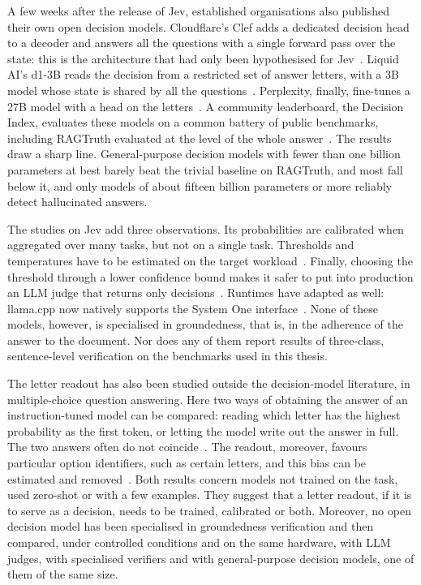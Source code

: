 A few weeks after the release of Jev, established organisations also published their own open decision models.
Cloudflare's Clef adds a dedicated decision head to a decoder and answers all the questions with a single forward pass
over the state: this is the architecture that had only been hypothesised for Jev~\cite{cloudflare2026clef}. Liquid AI's
d1-3B reads the decision from a restricted set of answer letters, with a 3B model whose state is shared by all the
questions~\cite{liquid2026d1}. Perplexity, finally, fine-tunes a 27B model with a head on the
letters~\cite{perplexity2026decider}. A community leaderboard, the Decision Index, evaluates these models on a common
battery of public benchmarks, including RAGTruth evaluated at the level of the whole answer~\cite{decisionindex2026}.
The results draw a sharp line. General-purpose decision models with fewer than one billion parameters at best barely beat the trivial baseline on RAGTruth, and most fall below it, and only models of about fifteen billion parameters or more reliably detect hallucinated answers.

The studies on Jev add three observations. Its probabilities are calibrated when aggregated over many tasks, but not on
a single task. Thresholds and temperatures have to be estimated on the target workload~\cite{guo2026justaskjev,li2026jevjudge}.
Finally, choosing the threshold through a lower confidence bound makes it safer to put into production an LLM judge that
returns only decisions~\cite{li2026jevjudge}. Runtimes have adapted as well: llama.cpp now natively supports the System
One interface~\cite{llamacpp}. None of these models, however, is specialised in groundedness, that is, in the adherence
of the answer to the document. Nor does any of them report results of three-class, sentence-level verification on the
benchmarks used in this thesis.

The letter readout has also been studied outside the decision-model literature, in multiple-choice question answering.
Here two ways of obtaining the answer of an instruction-tuned model can be compared: reading which letter has the highest
probability as the first token, or letting the model write out the answer in full. The two answers often do not
coincide~\cite{wang2024myanswerc}. The readout, moreover, favours particular option identifiers, such as certain
letters, and this bias can be estimated and removed~\cite{zheng2024mcq}. Both results concern models not trained on the task, used zero-shot or with a few examples.
They suggest that a letter readout, if it is to serve as a decision, needs to be trained, calibrated or both. Moreover,
no open decision model has been specialised in groundedness verification and then compared, under controlled conditions
and on the same hardware, with LLM judges, with specialised verifiers and with general-purpose decision models,
one of them of the same size.

